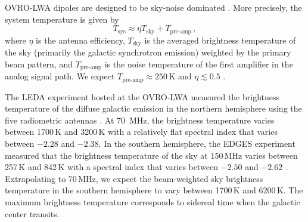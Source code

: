\begin{bibunit}
OVRO-LWA dipoles are designed to be sky-noise dominated \citep[$\ge6$\,dB between 20--80\,MHz;
][]{2012PASP..124.1090H}. More precisely, the system temperature is given by
\begin{equation}
    T_\text{sys} \approx \eta T_\text{sky} + T_\text{pre-amp}\,,
\end{equation}
where $\eta$ is the antenna efficiency, $T_\text{sky}$ is the averaged brightness temperature of the
sky (primarily the galactic synchrotron emission) weighted by the primary beam pattern, and
$T_\text{pre-amp}$ is the noise temperature of the first amplifier in the analog signal path. We
expect $T_\text{pre-amp} \approx 250\,\text{K}$ and $\eta \lesssim 0.5$ \citep{2012PASP..124.1090H}.

The LEDA experiment hosted at the OVRO-LWA measured the brightness temperature of the diffuse
galactic emission in the northern hemisphere using the five radiometric antennas
\citep{2018MNRAS.478.4193P}. At 70~MHz, the brightness temperature varies between 1700\,K and
3200\,K with a relatively flat spectral index that varies between $-2.28$ and $-2.38$.  In the
southern hemisphere, the EDGES experiment measured that the brightness temperature of the sky at
150\,MHz varies between 257\,K and 842\,K with a spectral index that varies between $-2.50$ and
$-2.62$ \citep{2017MNRAS.464.4995M}. Extrapolating to 70\,MHz, we expect the beam-weighted sky
brightness temperature in the southern hemisphere to vary between 1700\,K and 6200\,K. The maximum
brightness temperature corresponds to sidereal time when the galactic center transits.


\end{bibunit}
